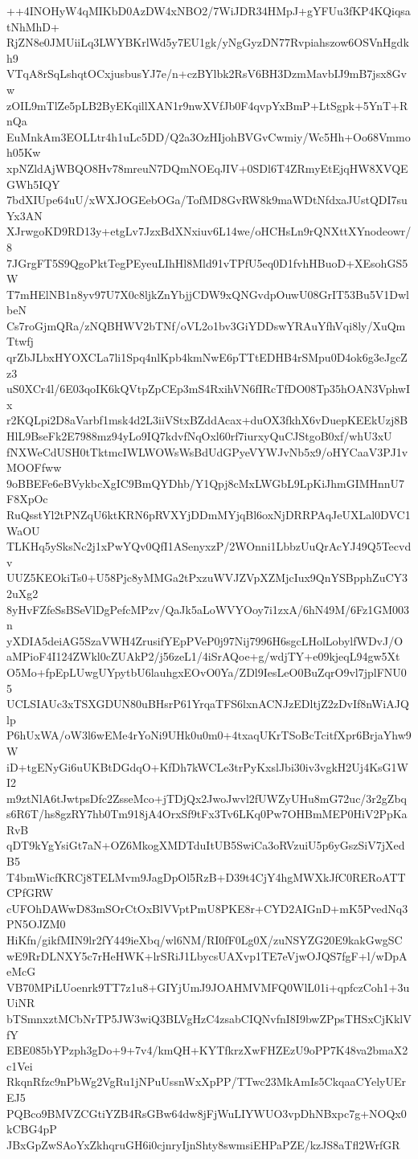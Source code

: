 ++4INOHyW4qMIKbD0AzDW4xNBO2/7WiJDR34HMpJ+gYFUu3fKP4KQiqsatNhMhD+
RjZN8e0JMUiiLq3LWYBKrlWd5y7EU1gk/yNgGyzDN77Rvpiahszow6OSVnHgdkh9
VTqA8rSqLshqtOCxjusbusYJ7e/n+czBYlbk2RsV6BH3DzmMavbIJ9mB7jsx8Gvw
zOIL9mTlZe5pLB2ByEKqillXAN1r9nwXVfJb0F4qvpYxBmP+LtSgpk+5YnT+RnQa
EuMnkAm3EOLLtr4h1uLc5DD/Q2a3OzHIjohBVGvCwmiy/Wc5Hh+Oo68Vmmoh05Kw
xpNZldAjWBQO8Hv78mreuN7DQmNOEqJIV+0SDl6T4ZRmyEtEjqHW8XVQEGWh5IQY
7bdXIUpe64uU/xWXJOGEebOGa/TofMD8GvRW8k9maWDtNfdxaJUstQDI7suYx3AN
XJrwgoKD9RD13y+etgLv7JzxBdXNxiuv6L14we/oHCHsLn9rQNXttXYnodeowr/8
7JGrgFT5S9QgoPktTegPEyeuLIhHl8Mld91vTPfU5eq0D1fvhHBuoD+XEsohGS5W
T7mHElNB1n8yv97U7X0c8ljkZnYbjjCDW9xQNGvdpOuwU08GrIT53Bu5V1DwlbeN
Cs7roGjmQRa/zNQBHWV2bTNf/oVL2o1bv3GiYDDswYRAuYfhVqi8ly/XuQmTtwfj
qrZbJLbxHYOXCLa7li1Spq4nlKpb4kmNwE6pTTtEDHB4rSMpu0D4ok6g3eJgcZz3
uS0XCr4l/6E03qoIK6kQVtpZpCEp3mS4RxihVN6fIRcTfDO08Tp35hOAN3VphwIx
r2KQLpi2D8aVarbf1msk4d2L3iiVStxBZddAcax+duOX3fkhX6vDuepKEEkUzj8B
HlL9BseFk2E7988mz94yLo9IQ7kdvfNqOxl60rf7iurxyQuCJStgoB0xf/whU3xU
fNXWeCdUSH0tTktmcIWLWOWsWsBdUdGPyeVYWJvNb5x9/oHYCaaV3PJ1vMOOFfww
9oBBEFe6eBVykbcXgIC9BmQYDhb/Y1Qpj8cMxLWGbL9LpKiJhmGIMHnnU7F8XpOc
RuQsstYl2tPNZqU6ktKRN6pRVXYjDDmMYjqBl6oxNjDRRPAqJeUXLal0DVC1WaOU
TLKHq5ySksNc2j1xPwYQv0QfI1ASenyxzP/2WOnni1LbbzUuQrAcYJ49Q5Tecvdv
UUZ5KEOkiTs0+U58Pjc8yMMGa2tPxzuWVJZVpXZMjcIux9QnYSBpphZuCY32uXg2
8yHvFZfeSsBSeVlDgPefcMPzv/QaJk5aLoWVYOoy7i1zxA/6hN49M/6Fz1GM003n
yXDIA5deiAG5SzaVWH4ZrusifYEpPVeP0j97Nij7996H6sgcLHolLobylfWDvJ/O
aMPioF4I124ZWkl0cZUAkP2/j56zeL1/4iSrAQoe+g/wdjTY+e09kjeqL94gw5Xt
O5Mo+fpEpLUwgUYpytbU6lauhgxEOvO0Ya/ZDl9IesLeO0BuZqrO9vl7jplFNU05
UCLSIAUc3xTSXGDUN80uBHsrP61YrqaTFS6lxnACNJzEDltjZ2zDvIf8nWiAJQlp
P6hUxWA/oW3l6wEMe4rYoNi9UHk0u0m0+4txaqUKrTSoBcTcitfXpr6BrjaYhw9W
iD+tgENyGi6uUKBtDGdqO+KfDh7kWCLe3trPyKxslJbi30iv3vgkH2Uj4KsG1WI2
m9ztNlA6tJwtpsDfc2ZsseMco+jTDjQx2JwoJwvl2fUWZyUHu8mG72uc/3r2gZbq
s6R6T/hs8gzRY7hb0Tm918jA4OrxSf9tFx3Tv6LKq0Pw7OHBmMEP0HiV2PpKaRvB
qDT9kYgYsiGt7aN+OZ6MkogXMDTduItUB5SwiCa3oRVzuiU5p6yGszSiV7jXedB5
T4bmWicfKRCj8TELMvm9JagDpOl5RzB+D39t4CjY4hgMWXkJfC0RERoATTCPfGRW
cUFOhDAWwD83mSOrCtOxBlVVptPmU8PKE8r+CYD2AIGnD+mK5PvedNq3PN5OJZM0
HiKfn/gikfMIN9lr2fY449ieXbq/wl6NM/RI0fF0Lg0X/zuNSYZG20E9kakGwgSC
wE9RrDLNXY5c7rHeHWK+lrSRiJ1LbycsUAXvp1TE7eVjwOJQS7fgF+l/wDpAeMcG
VB70MPiLUoenrk9TT7z1u8+GIYjUmJ9JOAHMVMFQ0WlL01i+qpfczCoh1+3uUiNR
bTSmnxztMCbNrTP5JW3wiQ3BLVgHzC4zsabCIQNvfnI8I9bwZPpsTHSxCjKklVfY
EBE085bYPzph3gDo+9+7v4/kmQH+KYTfkrzXwFHZEzU9oPP7K48va2bmaX2c1Vei
RkqnRfzc9nPbWg2VgRu1jNPuUssnWxXpPP/TTwc23MkAmIs5CkqaaCYelyUErEJ5
PQBco9BMVZCGtiYZB4RsGBw64dw8jFjWuLIYWUO3vpDhNBxpc7g+NOQx0kCBG4pP
JBxGpZwSAoYxZkhqruGH6i0cjnryIjnShty8swmsiEHPaPZE/kzJS8aTfl2WrfGR
